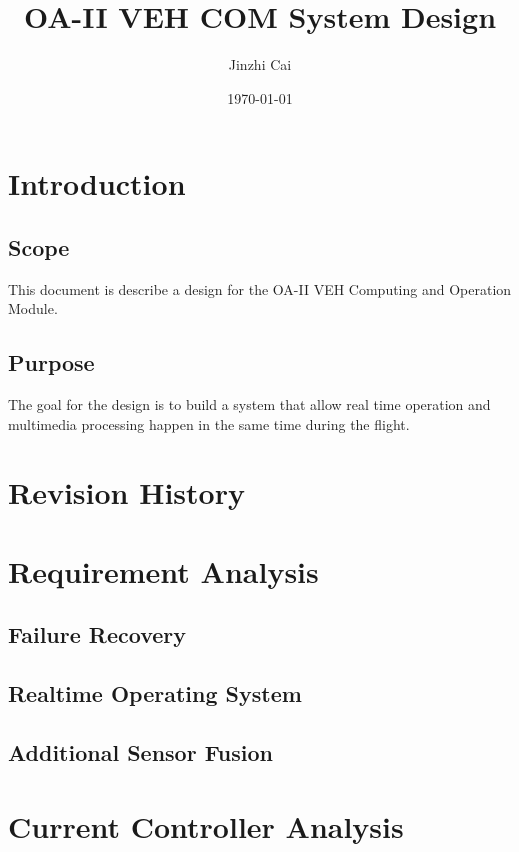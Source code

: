 \documentclass[12pt,article]{memoir}
\title{OA-II VEH COM System Design}
\author{Jinzhi Cai}
\date{\today}
\begin{document}
	


\tableofcontents*
\clearpage



\chapter{Introduction}
\section{Scope}
This document is describe a design for the OA-II VEH Computing and Operation Module.
\section{Purpose}
The goal for the design is to build a system that allow real time operation and multimedia processing happen in the same time during the flight.
\chapter{Revision History}
\begin{table}[H]
	\centering
	\caption{Summary of Revision History}
	\label{tab:rev}
\end{table}
\newpage
\chapter{Requirement Analysis}
\section{Failure Recovery}
\section{Realtime Operating System}
\section{Additional Sensor Fusion}
\newpage
\chapter{Current Controller Analysis}
\end{document}

